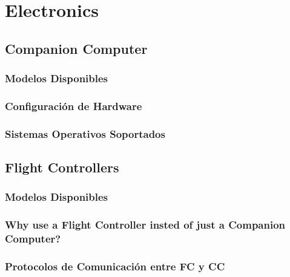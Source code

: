 
\section{Electronics}

\subsection{Companion Computer}
    \subsubsection{Modelos Disponibles}
    \subsubsection{Configuración de Hardware}
    \subsubsection{Sistemas Operativos Soportados}

\subsection{Flight Controllers}
    \subsubsection{Modelos Disponibles}
    \subsubsection{Why use a Flight Controller insted of just a Companion Computer?}
    \subsubsection{Protocolos de Comunicación entre FC y CC}